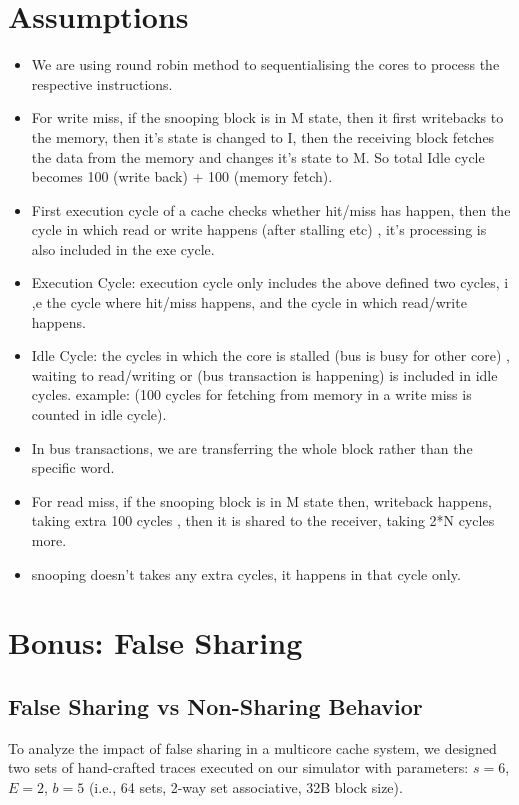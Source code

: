 \documentclass{article}
\begin{document}
\section{Assumptions}
\begin{itemize}
    \item We are using round robin method to sequentialising the cores to process the respective instructions.
    
    \item For write miss, if the snooping block is in M state, then it first writebacks to the memory, then it's state is changed to I, then the receiving block fetches the data from the memory and changes it's state to M. So total Idle cycle becomes 100 (write back) + 100 (memory fetch).
    \item First execution cycle of a cache checks whether hit/miss has happen, then the cycle in which read or write happens (after stalling etc) , it's processing is also included in the exe cycle.
    \item Execution Cycle: execution cycle only includes the above defined two cycles, i ,e the cycle where hit/miss happens, and the cycle in which read/write happens.
    \item Idle Cycle: the cycles in which the core is stalled (bus is busy for other core) ,  waiting to read/writing or (bus transaction is happening) is included in idle cycles. example: (100 cycles for fetching from memory in a write miss is counted in idle cycle).
    \item In bus transactions, we are transferring the whole block rather than the specific word.
    \item For read miss, if the snooping block is in M state then, writeback happens, taking extra 100 cycles , then it is shared to the receiver, taking 2*N cycles more.
    \item snooping doesn't takes any extra cycles, it happens in that cycle only.
\end{itemize}
\section{Bonus: False Sharing}
\subsection{False Sharing vs Non-Sharing Behavior}

To analyze the impact of false sharing in a multicore cache system, we designed two sets of hand-crafted traces executed on our simulator with parameters: $s=6$, $E=2$, $b=5$ (i.e., 64 sets, 2-way set associative, 32B block size).
\end{document}
